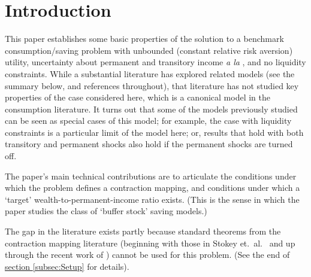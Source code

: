 \documentclass[titlepage]{\econtex}\providecommand{\texname}{BufferStockTheory}%
\begin{document}
\titlepagefinish


\newtheorem{defn}{Definition}
\newtheorem{theorem}{Theorem}

\hypertarget{Introduction}{}
\section{Introduction}

\label{sec:intro}


This paper establishes some basic properties of the solution to a benchmark consumption/saving problem with unbounded (constant relative risk aversion) utility, uncertainty about permanent and transitory income \textit{a la} \cite{friedmanATheory}, and no liquidity constraints.  While a substantial literature has explored related models (see the summary below, and references throughout), that literature has not studied key properties of the case considered here, which is a canonical model in the consumption literature.  It turns out that some of the models previously studied can be seen as special cases of this model; for example, the case with liquidity constraints is a particular limit of the model here; or, results that hold with both transitory and permanent shocks also hold if the permanent shocks are turned off.

The paper's main technical contributions are to articulate the conditions under which the problem defines a contraction mapping, and conditions under which a `target' wealth-to-permanent-income ratio exists.  (This is the sense in which the paper studies the class of `buffer stock' saving models.)

The gap in the literature exists partly because standard theorems from the contraction mapping literature (beginning with those in Stokey et.~al.~\citeyearpar{slpMethods} and up through the recent work of \cite{mnUnique}) cannot be used for this problem.  (See the end of \hyperlink{DiffFromLit}{section \ref{subsec:Setup}} for details).
\end{document}
